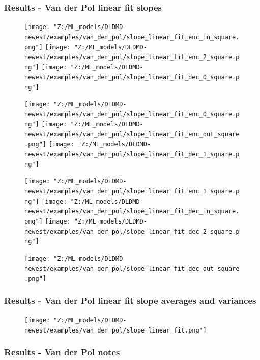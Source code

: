 \documentclass[11pt,aspectratio=169]{beamer}
\begin{document}
    \begin{frame}
        \frametitle{Results - Van der Pol linear fit slopes} 
        \begin{figure}
            \centering
            \begin{minipage}{.3333\textwidth}
                \texttt{[image: "Z:/ML\_models/DLDMD-newest/examples/van\_der\_pol/slope\_linear\_fit\_enc\_in\_square.png"]}
                \texttt{[image: "Z:/ML\_models/DLDMD-newest/examples/van\_der\_pol/slope\_linear\_fit\_enc\_2\_square.png"]}
                \texttt{[image: "Z:/ML\_models/DLDMD-newest/examples/van\_der\_pol/slope\_linear\_fit\_dec\_0\_square.png"]}
            \end{minipage}%
            \begin{minipage}{.3333\textwidth}
                \texttt{[image: "Z:/ML\_models/DLDMD-newest/examples/van\_der\_pol/slope\_linear\_fit\_enc\_0\_square.png"]}
                \texttt{[image: "Z:/ML\_models/DLDMD-newest/examples/van\_der\_pol/slope\_linear\_fit\_enc\_out\_square.png"]}
                \texttt{[image: "Z:/ML\_models/DLDMD-newest/examples/van\_der\_pol/slope\_linear\_fit\_dec\_1\_square.png"]}
            \end{minipage}%
            \begin{minipage}{.3333\textwidth}
                \texttt{[image: "Z:/ML\_models/DLDMD-newest/examples/van\_der\_pol/slope\_linear\_fit\_enc\_1\_square.png"]}
                \texttt{[image: "Z:/ML\_models/DLDMD-newest/examples/van\_der\_pol/slope\_linear\_fit\_dec\_in\_square.png"]}
                \texttt{[image: "Z:/ML\_models/DLDMD-newest/examples/van\_der\_pol/slope\_linear\_fit\_dec\_2\_square.png"]}
            \end{minipage}
            \texttt{[image: "Z:/ML\_models/DLDMD-newest/examples/van\_der\_pol/slope\_linear\_fit\_dec\_out\_square.png"]}
        \end{figure}
    \end{frame}

    \begin{frame}
        \frametitle{Results - Van der Pol linear fit slope averages and variances}
        
        \begin{figure}
            \centering
            \texttt{[image: "Z:/ML\_models/DLDMD-newest/examples/van\_der\_pol/slope\_linear\_fit.png"]}
        \end{figure}
    \end{frame}

    \begin{frame}
        \frametitle{Results - Van der Pol notes}

    \end{frame}
\end{document}
